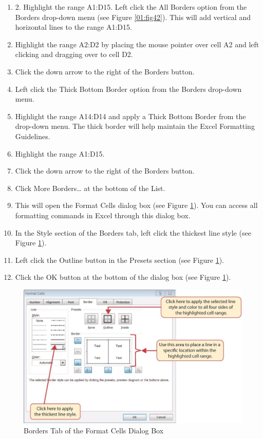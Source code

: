 \begin{enumerate}[resume]
	\item 2. Highlight the range \textsf{A1:D15}. Left click the All Borders option from the Borders drop-down menu (see Figure \ref{01:fig42}). This will add vertical and horizontal lines to the range \textsf{A1:D15}.
	\item Highlight the range \textsf{A2:D2} by placing the mouse pointer over cell \textsf{A2} and left clicking and dragging over to cell \textsf{D2}.
	\item Click the down arrow to the right of the Borders button.
	\item Left click the Thick Bottom Border option from the Borders drop-down menu.
	\item Highlight the range \textsf{A14:D14} and apply a Thick Bottom Border from the drop-down menu. The thick border will help maintain the Excel Formatting Guidelines.
	\item Highlight the range \textsf{A1:D15}.
	\item Click the down arrow to the right of the Borders button.
	\item Click More Borders… at the bottom of the List.
	\item This will open the Format Cells dialog box (see Figure \ref{01:fig43}). You can access all formatting commands in Excel through this dialog box.
	\item In the Style section of the Borders tab, left click the thickest line style (see Figure \ref{01:fig43}).
	\item Left click the Outline button in the Presets section (see Figure \ref{01:fig43}).
	\item Click the OK button at the bottom of the dialog box (see Figure \ref{01:fig43}).
\end{enumerate}

\begin{figure}[H]
	\centering
	\includegraphics[width=\maxwidth{.95\linewidth}]{gfx/ch01_fig43}
	\caption{Borders Tab of the Format Cells Dialog Box}
	\label{01:fig43}
\end{figure}

